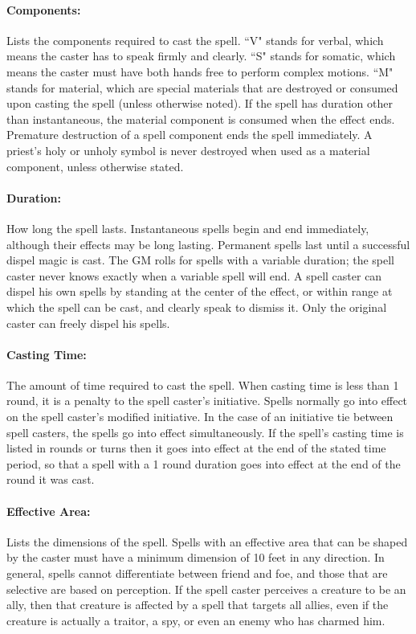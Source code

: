 \begin{multicols}{2}
\paragraph{Components:} Lists the components required to cast the spell.  ``V" stands for verbal, which means the caster has to speak firmly and clearly.  ``S" stands for somatic, which means the caster must have both hands free to perform complex motions.  ``M" stands for material, which are special materials that are destroyed or consumed upon casting the spell (unless otherwise noted).  If the spell has duration other than instantaneous, the material component is consumed when the effect ends.  Premature destruction of a spell component ends the spell immediately.  A priest's holy or unholy symbol is never destroyed when used as a material component, unless otherwise stated.

\paragraph{Duration:} How long the spell lasts.  Instantaneous spells begin and end immediately, although their effects may be long lasting.  Permanent spells last until a successful dispel magic is cast.  The GM rolls for spells with a variable duration; the spell caster never knows exactly when a variable spell will end.  A spell caster can dispel his own spells by standing at the center of the effect, or within range at which the spell can be cast, and clearly speak to dismiss it.  Only the original caster can freely dispel his spells.

\paragraph{Casting Time:} The amount of time required to cast the spell. When casting time is less than 1 round, it is a penalty to the spell caster's initiative.  Spells normally go into effect on the spell caster's modified initiative.  In the case of an initiative tie between spell casters, the spells go into effect simultaneously.  If the spell's casting time is listed in rounds or turns then it goes into effect at the end of the stated time period, so that a spell with a 1 round duration goes into effect at the end of the round it was cast.

\paragraph{Effective Area:}  Lists the dimensions of the spell.  Spells with an effective area that can be shaped by the caster must have a minimum dimension of 10 feet in any direction.  In general, spells cannot differentiate between friend and foe, and those that are selective are based on perception.  If the spell caster perceives a creature to be an ally, then that creature is affected by a spell that targets all allies, even if the creature is actually a traitor, a spy, or even an enemy who has charmed him.


\end{multicols}
